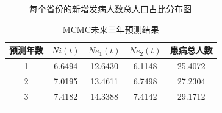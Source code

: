 \documentclass[12pt,twoside,UTF8]{ctexart}
\theoremstyle{nonumberplain}
\newcommand{\wuhao}{\fontsize{10.5pt}{\baselineskip}\selectfont}
\begin{document}
\begin{figure}[H]%
  \centering
    \hspace{0in}
  \caption{\heiti  每个省份的新增发病人数总人口占比分布图}
  \label{f2}
\end{figure}


\begin{table}[H]%
  \wuhao 
  \label{t1} 
  \tabcolsep 1mm 
  \caption{\heiti MCMC未来三年预测结果}
  \centering
    \begin{tabular}{ccccc}
    \Xhline{0.8pt}
      预测年数 & $Ni(t)$ & $Ne_1(t)$ & $Ne_2(t)$ & 患病总人数\\
    \hline
	1      & 6.6494  & 12.6430   & 6.1148    & 25.4072\\
	2      & 7.0195  & 13.4611   & 6.7498    & 27.2304\\
	3      & 7.4182  & 14.3388   & 7.4142    & 29.1712\\
    \Xhline{0.8pt}
    \multicolumn{5}{l}{\wuhao *单位：10万人}\\
    \end{tabular} 
\end{table}

\end{document}
